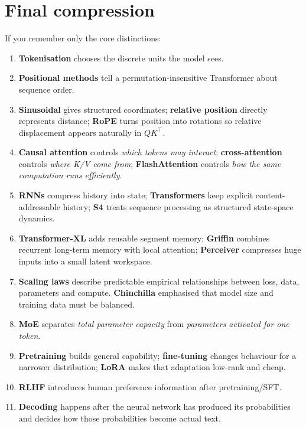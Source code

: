 \section{Final compression}
\label{sec:modern-final-compression}
If you remember only the core distinctions:

\begin{enumerate}
\item \textbf{Tokenisation} chooses the discrete units the model sees.
\item \textbf{Positional methods} tell a permutation-insensitive Transformer about sequence order.
\item \textbf{Sinusoidal} gives structured coordinates; \textbf{relative position} directly represents distance; \textbf{RoPE} turns position into rotations so relative displacement appears naturally in $QK^\top$.
\item \textbf{Causal attention} controls \textit{which tokens may interact}; \textbf{cross-attention} controls \textit{where K/V come from}; \textbf{FlashAttention} controls \textit{how the same computation runs efficiently}.
\item \textbf{RNNs} compress history into state; \textbf{Transformers} keep explicit content-addressable history; \textbf{S4} treats sequence processing as structured state-space dynamics.
\item \textbf{Transformer-XL} adds reusable segment memory; \textbf{Griffin} combines recurrent long-term memory with local attention; \textbf{Perceiver} compresses huge inputs into a small latent workspace.
\item \textbf{Scaling laws} describe predictable empirical relationships between loss, data, parameters and compute.
\textbf{Chinchilla} emphasised that model size and training data must be balanced.
\item \textbf{MoE} separates \textit{total parameter capacity} from \textit{parameters activated for one token}.
\item \textbf{Pretraining} builds general capability; \textbf{fine-tuning} changes behaviour for a narrower distribution; \textbf{LoRA} makes that adaptation low-rank and cheap.
\item \textbf{RLHF} introduces human preference information after pretraining/SFT.
\item \textbf{Decoding} happens after the neural network has produced its probabilities and decides how those probabilities become actual text.
\end{enumerate}

